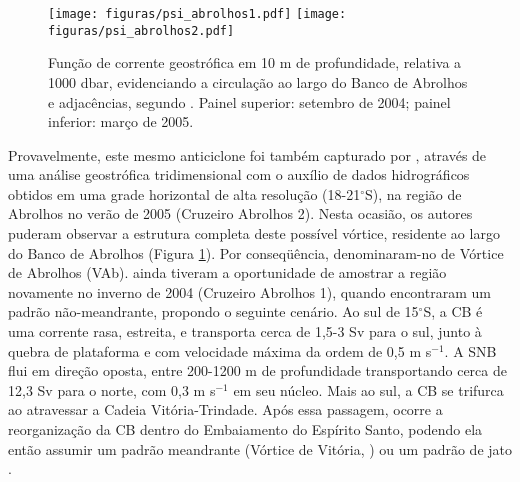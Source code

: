 \begin{figure}%
 \begin{center}
  \texttt{[image: figuras/psi\_abrolhos1.pdf]}
  \texttt{[image: figuras/psi\_abrolhos2.pdf]}
 \end{center}
 \vspace{-.5cm}
 \renewcommand{\baselinestretch}{1}
 \caption{\label{fig:abrolhos} \small Função de corrente geostrófica em 10 m de 
profundidade, relativa a 1000 dbar, evidenciando
a circulação ao largo do Banco de Abrolhos e adjacências, 
segundo \cite{silveira_etal2006B}. Painel superior: setembro de 2004; painel inferior: março de 2005.}
\end{figure}

Provavelmente, este mesmo anticiclone foi também capturado por \cite{silveira_etal2006B}, através 
de uma análise geostrófica tridimensional com o auxílio de dados hidrográficos
obtidos em uma grade horizontal de alta resolução (18-21$^\circ$S), na região de Abrolhos
no verão de 2005 (Cruzeiro Abrolhos 2). Nesta ocasião,
os autores puderam observar a estrutura completa deste possível vórtice, 
residente ao largo do Banco de Abrolhos (Figura \ref{fig:abrolhos}). Por conseq\"uência, 
denominaram-no de Vórtice de Abrolhos (VAb).
\cite{silveira_etal2006B} ainda 
tiveram a oportunidade de amostrar a região novamente no inverno de 2004 (Cruzeiro Abrolhos 1),
quando encontraram um padrão não-meandrante, propondo o seguinte cenário.
Ao sul de 15$^\circ$S, a CB é uma corrente rasa, estreita, e transporta cerca
de 1,5-3 Sv para o sul, junto à quebra de plataforma e com velocidade máxima da
ordem de 0,5 m s$^{-1}$. A SNB flui em direção oposta, entre 200-1200 m
de profundidade transportando cerca de 12,3 Sv para o norte, com 0,3 m s$^{-1}$
em seu núcleo. Mais ao sul, a CB se trifurca ao atravessar a Cadeia Vitória-Trindade.
Após essa passagem, ocorre a reorganização da CB dentro do Embaiamento do Espírito
Santo, podendo ela então assumir um padrão meandrante (Vórtice de Vitória, \cite{schmid_etal1995}) ou um
padrão de jato \citep{evans_etal1983}.

